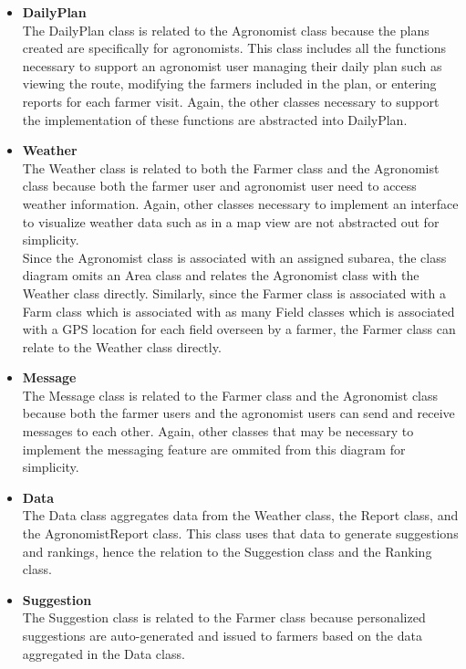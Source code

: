\begin{itemize}
\item \textbf{DailyPlan}\\
The DailyPlan class is related to the Agronomist class because the plans created are specifically for agronomists. This class includes all the functions necessary to support an agronomist user managing their daily plan such as viewing the route, modifying the farmers included in the plan, or entering reports for each farmer visit. Again, the other classes necessary to support the implementation of these functions are abstracted into DailyPlan.

\item \textbf{Weather}\\
The Weather class is related to both the Farmer class and the Agronomist class because both the farmer user and agronomist user need to access weather information. Again, other classes necessary to implement an interface to visualize weather data such as in a map view are not abstracted out for simplicity.
\smallskip\\
Since the Agronomist class is associated with an assigned subarea, the class diagram omits an Area class and relates the Agronomist class with the Weather class directly. Similarly, since the Farmer class is associated with a Farm class which is associated with as many Field classes which is associated with a GPS location for each field overseen by a farmer, the Farmer class can relate to the Weather class directly. 

\item \textbf{Message}\\
The Message class is related to the Farmer class and the Agronomist class because both the farmer users and the agronomist users can send and receive messages to each other. Again, other classes that may be necessary to implement the messaging feature are ommited from this diagram for simplicity.

\item \textbf{Data}\\
The Data class aggregates data from the Weather class, the Report class, and the AgronomistReport class. This class uses that data to generate suggestions and rankings, hence the relation to the Suggestion class and the Ranking class. 

\item \textbf{Suggestion}\\
The Suggestion class is related to the Farmer class because personalized suggestions are auto-generated and issued to farmers based on the data aggregated in the Data class.


\end{itemize}
